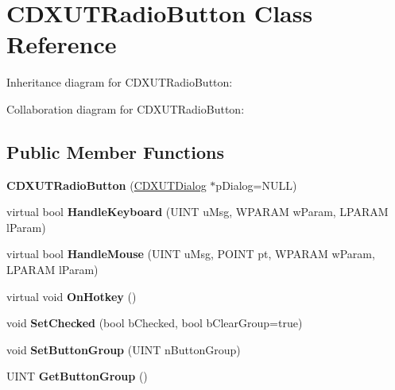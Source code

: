 \hypertarget{class_c_d_x_u_t_radio_button}{\section{C\+D\+X\+U\+T\+Radio\+Button Class Reference}
\label{class_c_d_x_u_t_radio_button}
}


Inheritance diagram for C\+D\+X\+U\+T\+Radio\+Button\+:


Collaboration diagram for C\+D\+X\+U\+T\+Radio\+Button\+:
\subsection*{Public Member Functions}
\begin{DoxyCompactItemize}
\item 
\hypertarget{class_c_d_x_u_t_radio_button_af6c3e04158bd02fd01c2328b951db366}{{\bfseries C\+D\+X\+U\+T\+Radio\+Button} (\hyperlink{class_c_d_x_u_t_dialog}{C\+D\+X\+U\+T\+Dialog} $\ast$p\+Dialog=N\+U\+L\+L)}\label{class_c_d_x_u_t_radio_button_af6c3e04158bd02fd01c2328b951db366}

\item 
\hypertarget{class_c_d_x_u_t_radio_button_a221492c2a117d1faaab749c1f3a88a4d}{virtual bool {\bfseries Handle\+Keyboard} (U\+I\+N\+T u\+Msg, W\+P\+A\+R\+A\+M w\+Param, L\+P\+A\+R\+A\+M l\+Param)}\label{class_c_d_x_u_t_radio_button_a221492c2a117d1faaab749c1f3a88a4d}

\item 
\hypertarget{class_c_d_x_u_t_radio_button_aab0a615727913f7f6c8e8d35cc2220e6}{virtual bool {\bfseries Handle\+Mouse} (U\+I\+N\+T u\+Msg, P\+O\+I\+N\+T pt, W\+P\+A\+R\+A\+M w\+Param, L\+P\+A\+R\+A\+M l\+Param)}\label{class_c_d_x_u_t_radio_button_aab0a615727913f7f6c8e8d35cc2220e6}

\item 
\hypertarget{class_c_d_x_u_t_radio_button_a2950447936727f33130fa4f6928045ac}{virtual void {\bfseries On\+Hotkey} ()}\label{class_c_d_x_u_t_radio_button_a2950447936727f33130fa4f6928045ac}

\item 
\hypertarget{class_c_d_x_u_t_radio_button_a697cac8fe1c233671808252e9407f0ac}{void {\bfseries Set\+Checked} (bool b\+Checked, bool b\+Clear\+Group=true)}\label{class_c_d_x_u_t_radio_button_a697cac8fe1c233671808252e9407f0ac}

\item 
\hypertarget{class_c_d_x_u_t_radio_button_ae9aeefdd748214afa0568bdb5ebadfbc}{void {\bfseries Set\+Button\+Group} (U\+I\+N\+T n\+Button\+Group)}\label{class_c_d_x_u_t_radio_button_ae9aeefdd748214afa0568bdb5ebadfbc}

\item 
\hypertarget{class_c_d_x_u_t_radio_button_a1b2f6d3405e49d94720ada2dda07dc20}{U\+I\+N\+T {\bfseries Get\+Button\+Group} ()}\label{class_c_d_x_u_t_radio_button_a1b2f6d3405e49d94720ada2dda07dc20}

\end{DoxyCompactItemize}
